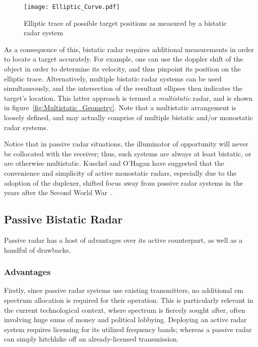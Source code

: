 \documentclass[class=report,11pt,crop=false]{standalone}
\begin{document}
\begin{figure}
    \centering
    \texttt{[image: Elliptic\_Curve.pdf]}
    \caption{Elliptic trace of possible target positions as measured by a bistatic radar system}
    \label{fig:Elliptic_Curve}
\end{figure}

As a consequence of this, bistatic radar requires additional measurements in order to locate a target accurately. For example, one can use the doppler shift of the object in order to determine its velocity, and thus pinpoint its position on the elliptic trace. Alternatively, multiple bistatic radar systems can be used simultaneously, and the intersection of the resultant ellipses then indicates the target's location. This latter approach is termed a \emph{multistatic} radar, and is shown in figure~\ref{fig:Multistatic_Geometry}. Note that a multistatic arrangement is loosely defined, and may actually comprise of multiple bistatic and/or monostatic radar systems.

Notice that in passive radar situations, the illuminator of opportunity will never be collocated with the receiver; thus, such systems are always at least bistatic, or are otherwise multistatic. Kuschel and O'Hagan have suggested that the convenience and simplicity of active monostatic radars, especially due to the adoption of the duplexer, shifted focus away from passive radar systems in the years after the Second World War~\cite{kuschel-hagan-history}.

\subsection{Passive Bistatic Radar}

Passive radar has a host of advantages over its active counterpart, as well as a handful of drawbacks.

\subsubsection{Advantages}
Firstly, since passive radar systems use existing transmitters, no additional \gls{em} spectrum allocation is required for their operation. This is particularly relevant in the current technological context, where spectrum is fiercely sought after, often involving huge sums of money and political lobbying. Deploying an active radar system requires licensing for its utilized frequency bands; whereas a passive radar can simply hitchhike off an already-licensed transmission.
\end{document}
